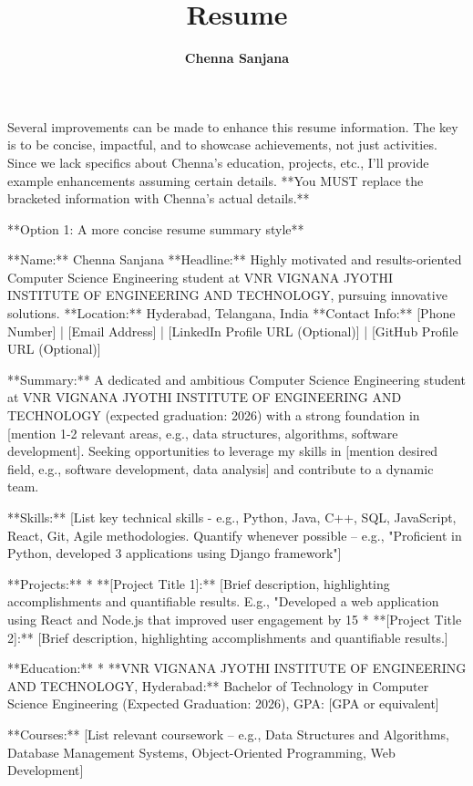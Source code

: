 \documentclass[a4paper, 12pt]{article}
\begin{document}
    \title{\textbf{Resume}}
    \author{\textbf{Chenna Sanjana}}
    \date{}
    \maketitle

    Several improvements can be made to enhance this resume information.  The key is to be concise, impactful, and to showcase achievements, not just activities.  Since we lack specifics about Chenna's education, projects, etc., I'll provide example enhancements assuming certain details.  **You MUST replace the bracketed information with Chenna's actual details.**


**Option 1:  A more concise resume summary style**

**Name:** Chenna Sanjana
**Headline:**  Highly motivated and results-oriented Computer Science Engineering student at VNR VIGNANA JYOTHI INSTITUTE OF ENGINEERING AND TECHNOLOGY, pursuing innovative solutions.
**Location:** Hyderabad, Telangana, India
**Contact Info:** [Phone Number] | [Email Address] | [LinkedIn Profile URL (Optional)] | [GitHub Profile URL (Optional)]

**Summary:**  A dedicated and ambitious Computer Science Engineering student at VNR VIGNANA JYOTHI INSTITUTE OF ENGINEERING AND TECHNOLOGY (expected graduation: 2026) with a strong foundation in [mention 1-2 relevant areas, e.g., data structures, algorithms, software development].  Seeking opportunities to leverage my skills in [mention desired field, e.g., software development, data analysis] and contribute to a dynamic team.

**Skills:**  [List key technical skills -  e.g., Python, Java, C++, SQL, JavaScript, React, Git, Agile methodologies.  Quantify whenever possible – e.g., "Proficient in Python, developed 3 applications using Django framework"]

**Projects:**
* **[Project Title 1]:** [Brief description, highlighting accomplishments and quantifiable results.  E.g., "Developed a web application using React and Node.js that improved user engagement by 15%
* **[Project Title 2]:** [Brief description, highlighting accomplishments and quantifiable results.]


**Education:**
* **VNR VIGNANA JYOTHI INSTITUTE OF ENGINEERING AND TECHNOLOGY, Hyderabad:**  Bachelor of Technology in Computer Science Engineering (Expected Graduation: 2026), GPA: [GPA or equivalent]


**Courses:** [List relevant coursework – e.g., Data Structures and Algorithms, Database Management Systems, Object-Oriented Programming, Web Development]
\end{document}
